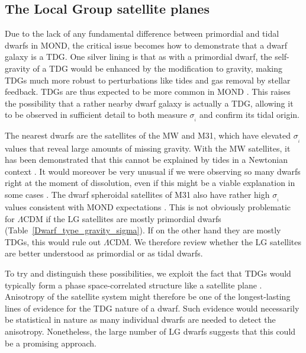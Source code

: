 \documentclass[fleqn,usenatbib,useAMS]{mnras} %
\begin{document}
\subsection{The Local Group satellite planes}
\label{Local_Group_satellite_planes}

Due to the lack of any fundamental difference between primordial and tidal dwarfs in MOND, the critical issue becomes how to demonstrate that a dwarf galaxy is a TDG. One silver lining is that as with a primordial dwarf, the self-gravity of a TDG would be enhanced by the modification to gravity, making TDGs much more robust to perturbations like tides and gas removal by stellar feedback. TDGs are thus expected to be more common in MOND \citep[as shown with numerical simulations;][]{Renaud_2016}. This raises the possibility that a rather nearby dwarf galaxy is actually a TDG, allowing it to be observed in sufficient detail to both measure $\sigma_{_i}$ and confirm its tidal origin.

The nearest dwarfs are the satellites of the MW and M31, which have elevated $\sigma_{_i}$ values that reveal large amounts of missing gravity. With the MW satellites, it has been demonstrated that this cannot be explained by tides in a Newtonian context \citep{McGaugh_Wolf_2010}. It would moreover be very unusual if we were observing so many dwarfs right at the moment of dissolution, even if this might be a viable explanation in some cases \citep{Kroupa_1997, Klessen_1998}. The dwarf spheroidal satellites of M31 also have rather high $\sigma_{_i}$ values consistent with MOND expectations \citep{McGaugh_2013a, McGaugh_2013b}. This is not obviously problematic for $\Lambda$CDM if the LG satellites are mostly primordial dwarfs (Table~\ref{Dwarf_type_gravity_sigma}). If on the other hand they are mostly TDGs, this would rule out $\Lambda$CDM. We therefore review whether the LG satellites are better understood as primordial or as tidal dwarfs.

To try and distinguish these possibilities, we exploit the fact that TDGs would typically form a phase space-correlated structure like a satellite plane \citep{Pawlowski_2011, Haslbauer_2019}. Anisotropy of the satellite system might therefore be one of the longest-lasting lines of evidence for the TDG nature of a dwarf. Such evidence would necessarily be statistical in nature as many individual dwarfs are needed to detect the anisotropy. Nonetheless, the large number of LG dwarfs \citep[e.g.][]{McConnachie_2012} suggests that this could be a promising approach.
\end{document}
